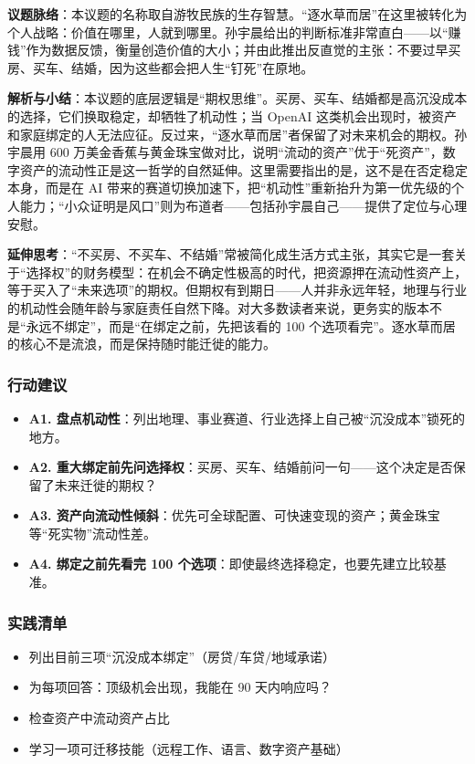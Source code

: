 \textbf{议题脉络}：本议题的名称取自游牧民族的生存智慧。``逐水草而居''在这里被转化为个人战略：价值在哪里，人就到哪里。孙宇晨给出的判断标准非常直白------以``赚钱''作为数据反馈，衡量创造价值的大小；并由此推出反直觉的主张：不要过早买房、买车、结婚，因为这些都会把人生``钉死''在原地。

\textbf{解析与小结}：本议题的底层逻辑是``期权思维''。买房、买车、结婚都是高沉没成本的选择，它们换取稳定，却牺牲了机动性；当
OpenAI
这类机会出现时，被资产和家庭绑定的人无法应征。反过来，``逐水草而居''者保留了对未来机会的期权。孙宇晨用
600
万美金香蕉与黄金珠宝做对比，说明``流动的资产''优于``死资产''，数字资产的流动性正是这一哲学的自然延伸。这里需要指出的是，这不是在否定稳定本身，而是在
AI
带来的赛道切换加速下，把``机动性''重新抬升为第一优先级的个人能力；``小众证明是风口''则为布道者------包括孙宇晨自己------提供了定位与心理安慰。

\textbf{延伸思考}：``不买房、不买车、不结婚''常被简化成生活方式主张，其实它是一套关于``选择权''的财务模型：在机会不确定性极高的时代，把资源押在流动性资产上，等于买入了``未来选项''的期权。但期权有到期日------人并非永远年轻，地理与行业的机动性会随年龄与家庭责任自然下降。对大多数读者来说，更务实的版本不是``永远不绑定''，而是``在绑定之前，先把该看的
100 个选项看完''。逐水草而居的核心不是流浪，而是保持随时能迁徙的能力。

\subsubsection{行动建议}

\begin{itemize}
\tightlist
\item
  \textbf{A1.
  盘点机动性}：列出地理、事业赛道、行业选择上自己被``沉没成本''锁死的地方。
\item
  \textbf{A2.
  重大绑定前先问选择权}：买房、买车、结婚前问一句------这个决定是否保留了未来迁徙的期权？
\item
  \textbf{A3.
  资产向流动性倾斜}：优先可全球配置、可快速变现的资产；黄金珠宝等``死实物''流动性差。
\item
  \textbf{A4. 绑定之前先看完 100
  个选项}：即使最终选择稳定，也要先建立比较基准。
\end{itemize}

\subsubsection{实践清单}

\begin{itemize}
\tightlist
\item[$\square$]
  列出目前三项``沉没成本绑定''（房贷/车贷/地域承诺）
\item[$\square$]
  为每项回答：顶级机会出现，我能在 90 天内响应吗？
\item[$\square$]
  检查资产中流动资产占比
\item[$\square$]
  学习一项可迁移技能（远程工作、语言、数字资产基础）
\end{itemize}


